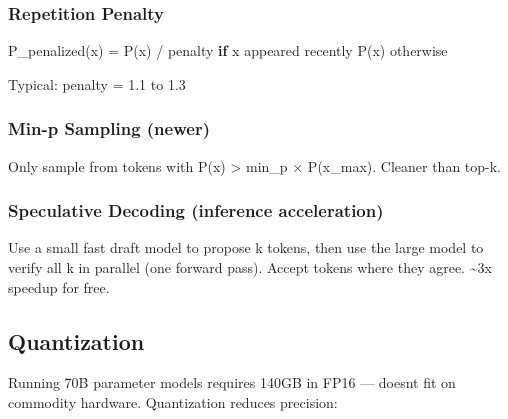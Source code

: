 \documentclass[11pt]{article}
\newenvironment{Shaded}{\begin{snugshade}}{\end{snugshade}}
\newcommand{\ControlFlowTok}[1]{\textcolor[rgb]{0.99,0.74,0.29}{\textbf{#1}}}
\newcommand{\FloatTok}[1]{\textcolor[rgb]{0.96,0.45,0.00}{#1}}
\newcommand{\NormalTok}[1]{\textcolor[rgb]{0.81,0.81,0.76}{#1}}
\newcommand{\OperatorTok}[1]{\textcolor[rgb]{0.81,0.81,0.76}{#1}}
\begin{document}
\subsubsection{Repetition Penalty}\label{repetition-penalty}


\begin{Shaded}
\begin{Highlighting}[]
\NormalTok{P\_penalized(x) }\OperatorTok{=}\NormalTok{ P(x) }\OperatorTok{/}\NormalTok{ penalty  }\ControlFlowTok{if}\NormalTok{ x appeared recently}
\NormalTok{                 P(x)             otherwise}

\NormalTok{Typical: penalty }\OperatorTok{=} \FloatTok{1.1}\NormalTok{ to }\FloatTok{1.3}
\end{Highlighting}
\end{Shaded}

\subsubsection{Min-p Sampling (newer)}\label{min-p-sampling-newer}

Only sample from tokens with P(x) \textgreater{} min\_p \(\times\) P(x\_max). Cleaner than top-k.

\subsubsection{Speculative Decoding (inference acceleration)}\label{speculative-decoding-inference-acceleration}

Use a small fast draft model to propose k tokens, then use the large model to verify all k in parallel (one forward pass). Accept tokens where they agree. \textasciitilde3x speedup for free.

\subsection{Quantization}\label{quantization}

Running 70B parameter models requires 140GB in FP16 --- doesn\textquotesingle t fit on commodity hardware. Quantization reduces precision:
\end{document}
